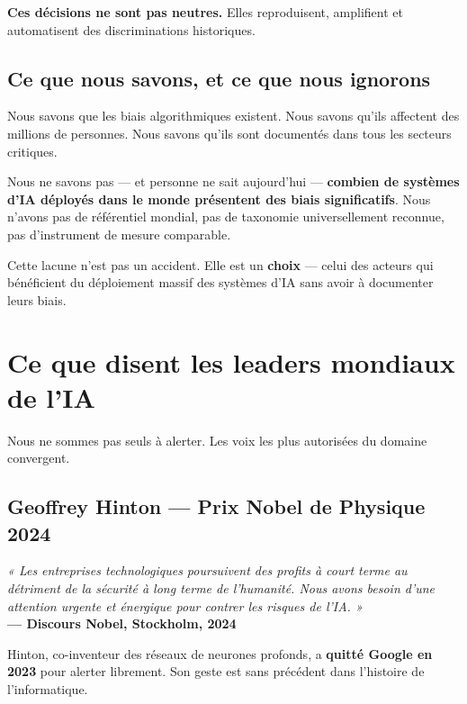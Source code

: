 \documentclass[11pt,a4paper,openany]{book}
\begin{document}
\begin{keybox}
\textbf{Ces décisions ne sont pas neutres.} Elles reproduisent, amplifient et automatisent des discriminations historiques.
\end{keybox}

\section{Ce que nous savons, et ce que nous ignorons}

Nous savons que les biais algorithmiques existent. Nous savons qu'ils affectent des millions de personnes. Nous savons qu'ils sont documentés dans tous les secteurs critiques.

Nous ne savons pas — et personne ne sait aujourd'hui — \textbf{combien de systèmes d'IA déployés dans le monde présentent des biais significatifs}. Nous n'avons pas de référentiel mondial, pas de taxonomie universellement reconnue, pas d'instrument de mesure comparable.

\begin{ideabox}
Cette lacune n'est pas un accident. Elle est un \textbf{choix} — celui des acteurs qui bénéficient du déploiement massif des systèmes d'IA sans avoir à documenter leurs biais.
\end{ideabox}

\chapter{Ce que disent les leaders mondiaux de l'IA}

Nous ne sommes pas seuls à alerter. Les voix les plus autorisées du domaine convergent.

\section{Geoffrey Hinton — Prix Nobel de Physique 2024}

\begin{quoteauthor}
\textit{« Les entreprises technologiques poursuivent des profits à court terme au détriment de la sécurité à long terme de l'humanité. Nous avons besoin d'une attention urgente et énergique pour contrer les risques de l'IA. »}\\[4pt]
\textbf{— Discours Nobel, Stockholm, 2024}
\end{quoteauthor}

Hinton, co-inventeur des réseaux de neurones profonds, a \textbf{quitté Google en 2023} pour alerter librement. Son geste est sans précédent dans l'histoire de l'informatique.
\end{document}
